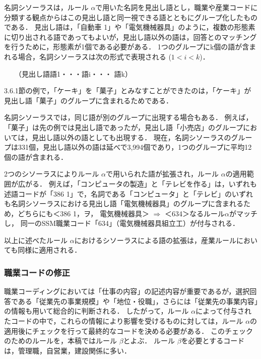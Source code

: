 \documentclass[japanese]{jnlp_1.4}
\begin{document}
名詞シソーラスは，ルール $\alpha$で用いた名詞を見出し語とし，職業や産業コードに分類する観点からはこの見出し語と同一視できる語とともにグループ化したものである．
見出し語は，「自動車 1」や「電気機械器具」のように，複数の形態素に切り出される語であってもよいが，見出し語以外の語は，回答とのマッチングを行うために，形態素が1個である必要がある．
1つのグループにk個の語が含まれる場合，名詞シソーラスは次の形式で表現される ($1<i<k$)．

\vspace{1\Cvs}
　　（見出し語\quad 語1\quad ・・・\quad 語i\quad ・・・ \quad 語k）
\vspace{1\Cvs}

3.6.1節の例で，「ケーキ」を「菓子」とみなすことができたのは，「ケーキ」が見出し語「菓子」のグループに含まれるためである．

名詞シソーラスでは，同じ語が別のグループに出現する場合もある．
例えば，「菓子」は先の例では見出し語であったが，見出し語「小売店」のグループにおいては，見出し語以外の語としても出現する．
現在，名詞シソーラスのグループは331個，見出し語以外の語は延べで3,994個であり，1つのグループに平均12個の語が含まれる．

2つのシソーラスによりルール $\alpha$で用いられた語が拡張され，ルール $\alpha$の適用範囲が広がる．
例えば，「コンピュータの製造」と「テレビを作る」は，いずれも述語コードが「386 1」で，名詞である「コンピュータ」と「テレビ」のいずれも名詞シソーラスにおける見出し語「電気機械器具」のグループに含まれるため，どちらにも＜386 1，ヲ， 電気機械器具＞ $\Rightarrow$ ＜634＞なるルール$\alpha$がマッチし， 同一のSSM職業コード「634」（電気機械器具組立工）が付与される．

以上に述べたルール $\alpha$におけるシソーラスによる語の拡張は，産業ルールにおいても同様に適用される．


\subsubsection{職業コードの修正}

職業コーディングにおいては「仕事の内容」の記述内容が重要であるが，選択回答である「従業先の事業規模」や「地位・役職」，さらには「従業先の事業内容」の情報も用いて総合的に判断される．
したがって，ルール $\alpha$によって付与されたコードの中で，これらの情報により影響を受けるものに対しては，ルール $\alpha$の適用後にチェックを行って最終的なコードを決める必要がある．
このチェックのためのルールを，本稿ではルール $\beta$とよぶ．
ルール $\beta$を必要とするコードは，管理職，自営業，建設関係に多い．
\end{document}
